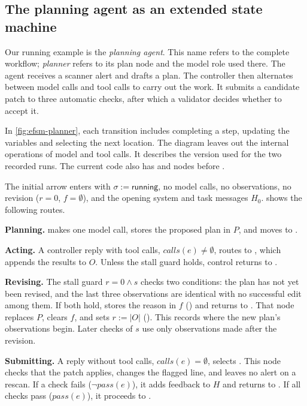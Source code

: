 \subsection{The planning agent as an extended state machine}
\label{sec:efsm-demo}

Our running example is the \emph{planning agent}. This name refers to the complete workflow;
\emph{planner} refers to its plan node and the model role used there. The agent receives a scanner
alert and drafts a plan. The controller then alternates between model calls and tool calls to
carry out the work. It submits a candidate patch to three automatic checks, after which a
validator decides whether to accept it.

In \cref{fig:efsm-planner}, each transition includes completing a step, updating the variables
and selecting the next location. The diagram leaves out the internal operations of model and
tool calls. It describes the version used for the two recorded runs. The current code also has
 and  nodes before .

The initial arrow enters  with $\sigma := \mathsf{running}$, no model calls, no
observations, no revision ($r = 0$, $f = \emptyset$), and the opening system and task messages
$H_0$.  shows the following routes.

\bi

\item \textbf{Planning.}  makes one model call, stores the proposed plan in $P$, and
moves to .

\item \textbf{Acting.} A controller reply with tool calls, $\mathit{calls}(e) \neq \emptyset$, routes
to , which appends the results to $O$. Unless the stall guard holds, control returns
to .

\item \textbf{Revising.} The stall guard $r = 0 \wedge s$ checks two conditions: the plan has not
yet been revised, and the last three observations are identical with no successful edit among
them. If both hold,  stores the reason in $f$ () and returns
to . That node replaces $P$, clears $f$, and sets $r := |O|$
(). This records where the new plan's observations begin. Later checks of
$s$ use only observations made after the revision.

\item \textbf{Submitting.} A reply without tool calls, $\mathit{calls}(e) = \emptyset$, selects
. This node checks that the patch applies, changes the flagged line, and leaves
no alert on a rescan. If a check fails ($\neg\mathit{pass}(e)$), it adds feedback to $H$ and
returns to . If all checks pass ($\mathit{pass}(e)$), it proceeds to
.

